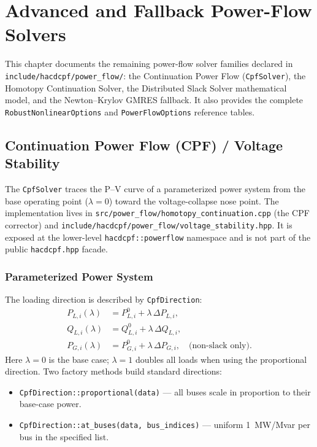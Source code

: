 \section{Advanced and Fallback Power-Flow Solvers}
\label{sec:advanced-pf}

This chapter documents the remaining power-flow solver families declared in
\texttt{include/hacdcpf/power\_flow/}: the Continuation Power Flow
(\texttt{CpfSolver}), the Homotopy Continuation Solver, the Distributed Slack
Solver mathematical model, and the Newton--Krylov GMRES fallback.  It also
provides the complete \texttt{RobustNonlinearOptions} and
\texttt{PowerFlowOptions} reference tables.

\subsection{Continuation Power Flow (CPF) / Voltage Stability}
\label{sec:cpf}

The \texttt{CpfSolver} traces the P--V curve of a parameterized power system
from the base operating point (\(\lambda=0\)) toward the voltage-collapse nose
point.  The implementation lives in
\texttt{src/power\_flow/homotopy\_continuation.cpp} (the CPF corrector) and
\texttt{include/hacdcpf/power\_flow/voltage\_stability.hpp}.  It is exposed at
the lower-level \texttt{hacdcpf::powerflow} namespace and is not part of the
public \texttt{hacdcpf.hpp} facade.

\subsubsection{Parameterized Power System}

The loading direction is described by \texttt{CpfDirection}:
\begin{align}
P_{L,i}(\lambda) &= P_{L,i}^0 + \lambda\,\Delta P_{L,i}, \\
Q_{L,i}(\lambda) &= Q_{L,i}^0 + \lambda\,\Delta Q_{L,i}, \\
P_{G,i}(\lambda) &= P_{G,i}^0 + \lambda\,\Delta P_{G,i},\quad \text{(non-slack only)}.
\end{align}
Here \(\lambda=0\) is the base case; \(\lambda=1\) doubles all loads when
using the proportional direction.  Two factory methods build standard directions:
\begin{itemize}
  \item \texttt{CpfDirection::proportional(data)} --- all buses scale in
  proportion to their base-case power.
  \item \texttt{CpfDirection::at\_buses(data, bus\_indices)} --- uniform
  1~MW/Mvar per bus in the specified list.
\end{itemize}

